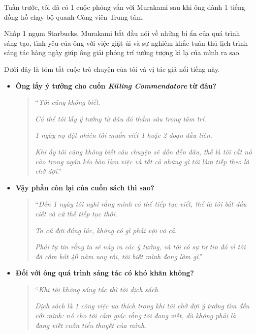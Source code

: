 \documentclass{book}
\numberwithin{equation}{section}
\begin{document}
Tuần trước, tôi đã có 1 cuộc phỏng vấn với Murakami sau khi ông dành 1 tiếng đồng hồ chạy bộ quanh Công viên Trung tâm.

Nhấp 1 ngụm Starbucks, Murakami bắt đầu nói về những bí ẩn của quá trình sáng tạo, tình yêu của ông với việc giặt ủi và sự nghiêm khắc tuân thủ lịch trình sáng tác hàng ngày giúp ông giải phóng trí tưởng tượng kì lạ của mình ra sao.

Dưới đây là tóm tắt cuộc trò chuyện của tôi và vị tác giả nổi tiếng này.

\begin{itemize}
    \item \textbf{Ông lấy ý tưởng cho cuốn \textit{Killing Commendatore} từ đâu?}
    
    \begin{quotation}
        ``\textit{Tôi cũng không biết}.
        
        \textit{Có thể tôi lấy ý tưởng từ đâu đó thẳm sâu trong tâm trí}.
        
        \textit{1 ngày nọ đột nhiên tôi muốn viết 1 hoặc 2 đoạn đầu tiên}.
        
        \textit{Khi ấy tôi cũng không biết câu chuyện sẽ dẫn đến đâu, thế là tôi cất nó vào trong ngăn kéo bàn làm việc và tất cả những gì tôi làm tiếp theo là chờ đợi}.''
    \end{quotation}
    
    \item \textbf{Vậy phần còn lại của cuốn sách thì sao?}
    
    \begin{quotation}
        ``\textit{Đến 1 ngày tôi nghĩ rằng mình có thể tiếp tục viết, thế là tôi bắt đầu viết và cứ thế tiếp tục thôi}.
        
        \textit{Ta cứ đợi đúng lúc, không có gì phải vội vã cả}.
        
        \textit{Phải tự tin rằng ta sẽ nảy ra các ý tưởng, và tôi có sự tự tin đó vì tôi đã cầm bút 40 năm nay rồi, tôi biết mình đang làm gì}.''
    \end{quotation}
    
    \item \textbf{Đối với ông quá trình sáng tác có khó khăn không?}
    \begin{quotation}
        ``\textit{Khi tôi không sáng tác thì tôi dịch sách}.
        
        \textit{Dịch sách là 1 công việc ưa thích trong khi tôi chờ đợi ý tưởng tìm đến với mình: nó cho tôi cảm giác rằng tôi đang viết, dù không phải là đang viết cuốn tiểu thuyết của mình}.
        

\end{quotation}
\end{itemize}
\end{document}
